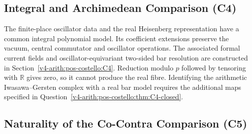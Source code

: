 \subsection{Integral and Archimedean Comparison (C4)}

The finite-place oscillator data and the real Heisenberg representation
have a common integral polynomial model. Its coefficient extensions
preserve the vacuum, central commutator and oscillator operations.
The associated formal current fields and oscillator-equivariant
two-sided bar resolution are constructed in
Section~\ref{v4-arith:pos-costello:C4}. Reduction modulo \(p\)
followed by tensoring with \(\mathbb R\) gives zero, so it cannot
produce the real fibre. Identifying the arithmetic Iwasawa--Gersten
complex with a real bar model requires the additional maps specified
in Question~\ref{v4-arith:pos-costello:thm:C4-closed}.

\subsection{Naturality of the Co-Contra Comparison (C5)}

